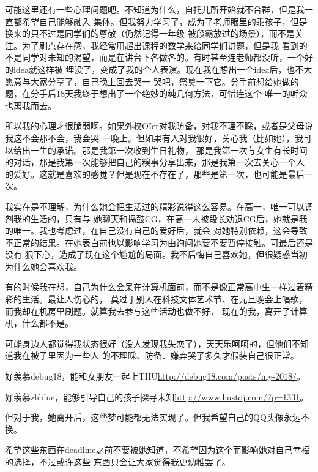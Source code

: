 可能这里还有一些心理问题吧。不知道为什么，自托儿所开始就不合群，但是我一直都希望自己能够融入
集体。但我努力学习了，成为了老师眼里的乖孩子，但是换来的只不过是同学们的尊敬（仍然记得一年级
被段霸放过的场景），而不是关注。为了刷点存在感，我经常用超出课程的数学来给同学们讲题，但是我
看到的不是同学对未知的渴望，而是在讲台下各做各的。有时甚至连老师都没听，一个好的idea就这样被
埋没了，变成了我的个人表演。现在我在想出一个idea后，也不大愿意与大家分享了，自己晚上回去哭一
哭吧，祭奠一下它。分手前想给她做的题，在分手后18天我终于想出了一个绝妙的纯几何方法，可惜连这个
唯一的听众也离我而去。

所以我的心理才很脆弱啊。如果外校OIer对我防备，对我不理不睬，或者是父母说我这不会那不会，我会哭
一晚上。但如果有人对我很好，关心我（比如她），我可以给出一生的承诺。那是我第一次收到生日礼物，
那是我第一次与女生有长时间的对话，那是我第一次能够把自己的糗事分享出来，那是我第一次去关心一个人
的爱好。这就是喜欢的感觉？但是现在不存在了，那些是第一次，也可能是最后一次。

我实在是不理解，为什么她会把生活过的精彩说得这么容易。在高一，唯一可以调剂我的生活的，只有与
她聊天和捣鼓CG，在高一末被段长劝退CG后，她就是我的唯一。我也考虑过，在自己没有自己的爱好后，就会
对她特别依赖，这会导致不正常的结果。在她表白前也以影响学习为由询问她要不要暂停接触。可最后还是没有
狠下心，造成了现在这个尴尬的局面。我不后悔自己喜欢她，但很疑惑当初为什么她会喜欢我。

有的时候我在想，自己为什么会呆在计算机面前，而不是像正常高中生一样过着精彩的生活。最让人伤心的，
莫过于别人在科技文体艺术节、在元旦晚会上唱歌，而我却在机房里刷题。就算我去参与这些活动也做不好，
现在的我，离开了计算机，什么都不是。

可能身边人都觉得我状态很好（没人发现我失恋了），天天乐呵呵的，但他们不知道我在被子里因为一些人
的不理睬、防备、嫌弃哭了多久才假装自己很正常。

好羡慕debug18，能和女朋友一起上THU\url{http://debug18.com/posts/my-2018/}。

好羡慕zhblue，能够引导自己的孩子探寻未知\url{http://www.hustoj.com/?p=1331}。

但对于我，她离开后，这些梦可能都无法实现了。但我希望自己的QQ头像永远不换。

希望这些东西在deadline之前不要被她知道，不希望因为这个而影响她对自己幸福的选择，不过或许这些
东西只会让大家觉得我更幼稚罢了。

